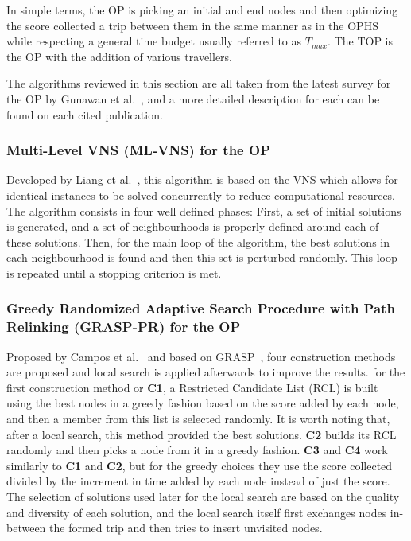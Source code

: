     In simple terms, the OP is picking an initial and end nodes and then optimizing the score collected a trip between them in the same manner as in the OPHS while respecting a general time budget usually referred to as $T_{max}$. The TOP is the OP with the addition of various travellers.
    
    The algorithms reviewed in this section are all taken from the latest survey for the OP by Gunawan et al.~\cite{gunawan2016}, and a more detailed description for each can be found on each cited publication.
    
\subsubsection{Multi-Level VNS (ML-VNS) for the OP}

    Developed by Liang et al.~\cite{liang2013}, this algorithm is based on the VNS which allows for identical instances to be solved concurrently to reduce computational resources. The algorithm consists in four well defined phases: First, a set of initial solutions is generated, and a set of neighbourhoods is properly defined around each of these solutions. Then, for the main loop of the algorithm, the best solutions in each neighbourhood is found and then this set is perturbed randomly. This loop is repeated until a stopping criterion is met.

\subsubsection{Greedy Randomized Adaptive Search Procedure with Path Relinking (GRASP-PR) for the OP}

    Proposed by Campos et al.~\cite{campos2014} and based on GRASP~\cite{resende2003}, four construction methods are proposed and local search is applied afterwards to improve the results. for the first construction method or \textbf{C1}, a Restricted Candidate List (RCL) is built using the best nodes in a greedy fashion based on the score added by each node, and then a member from this list is selected randomly. It is worth noting that, after a local search, this method provided the best solutions.  \textbf{C2} builds its RCL randomly and then picks a node from it in a greedy fashion. \textbf{C3} and \textbf{C4} work similarly to \textbf{C1} and \textbf{C2}, but for the greedy choices they use the score collected divided by the increment in time added by each node instead of just the score. The selection of solutions used later for the local search are based on the quality and diversity of each solution, and the local search itself first exchanges nodes in-between the formed trip and then tries to insert unvisited nodes.

